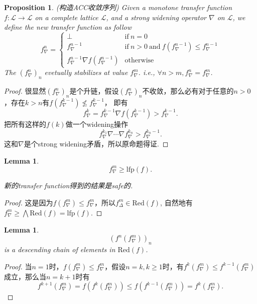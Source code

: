 \documentclass{article}
\newtheorem{lemma}[theorem]{Lemma}
\newtheorem{proposition}[theorem]{Proposition}
\newcommand*{\xfunc}[4]{{#2}\colon{#3}{#1}{#4}}
\newcommand*{\func}[3]{\xfunc{\to}{#1}{#2}{#3}}
\begin{document}
\begin{proposition}
\rm {\color{red}(构造ACC收敛序列)} Given a monotone transfer function $\func{f}{\mathcal{L}}{\mathcal{L}}$ on a complete lattice $\mathcal{L}$, and a strong widening operator $\nabla$ on $\mathcal{L}$, we define the new transfer function as follow
$$
f^n_\nabla = \left\{ \begin{array}{ll} \perp & \text{if}~n=0 \\ 
f^{n-1}_\nabla & \text{if}~n > 0~\text{and}~f(f^{n-1}_\nabla) \leq f^{n-1}_\nabla \\
f^{n-1}_\nabla \nabla f(f^{n-1}_\nabla) & \text{otherwise}
\end{array} \right.
$$
The $(f^n_\nabla)_n$ evetually stabilizes at value $f^m_\nabla$. i.e., $\forall n > m, f^n_\nabla = f^m_\nabla$.

\color{blue}  
\end{proposition}

\begin{proof}
很显然$(f^n_\nabla)_n$是个升链，假设$(f^n_\nabla)_n$不收敛，那么必有对于任意的$n > 0$，存在$k > n$有$f(f^{k-1}_\nabla) \nleq f^{k-1}_\nabla$， 即有
$$
f^k_\nabla=f^{k-1}_\nabla \nabla f(f^{k-1}_\nabla) > f^{k-1}_\nabla.
$$
把所有这样的$f(k)$做一个widening操作
$$
f^{k_1}_\nabla \nabla \cdots \nabla f^{k_n}_\nabla > f^{k_n-1}_\nabla.
$$
这和$\nabla$是个strong widening矛盾，所以原命题得证.
\end{proof}

\begin{lemma}\rm
$$
f^m_\nabla \geq \text{lfp}(f). 
$$

{\color{blue} 新的transfer function得到的结果是safe的}.
\end{lemma}

\begin{proof}
这是因为$f(f^m_\nabla) \leq f^m_\nabla$，所以$f^m_\Delta \in \text{Red}(f)$, 自然地有$f^m_\nabla \geq \bigwedge \text{Red}(f) = \text{lfp}(f)$.
\end{proof}

\begin{lemma}\rm
$$
(f^n(f^m_\nabla))_n
$$
is a descending chain of elements in $\text{Red}(f)$.
\end{lemma}

\begin{proof}
当$n=1$时，$f(f^m_\nabla) \leq f^m_\nabla$，假设$n=k, k \geq 1$时，有$f^k(f^m_\nabla) \leq f^{k-1}(f^m_\nabla)$成立，那么当$n= k+1$时有
$$
f^{k+1}(f^m_\nabla)= f(f^k(f^m_\nabla)) \leq f(f^{k-1}(f^m_\nabla)) = f^k(f^m_\nabla).
$$
\end{proof}
\end{document}
